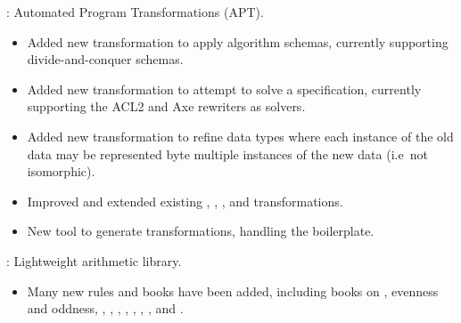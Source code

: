 \begin{frame}

\implibtitle

:
Automated Program Transformations (APT).
\begin{itemize}
\item Added new  transformation to apply algorithm schemas,
      currently supporting divide-and-conquer schemas.
\item Added new  transformation to attempt to solve a specification,
      currently supporting the ACL2 and Axe rewriters as solvers.
\item Added new  transformation to refine data types
      where each instance of the old data may be represented byte
      multiple instances of the new data (i.e\ not isomorphic).
\item Improved and extended existing
      , , , and 
      transformations.
\item New  tool to generate transformations, handling
      the boilerplate.
\end{itemize}

\end{frame}


\begin{frame}

\implibtitle

:
Lightweight arithmetic library.
\begin{itemize}
\item Many new rules and books have been added, including books on
 , evenness and oddness,
, , , , ,
\code{<=}, , and .
\end{itemize}

\end{frame}


